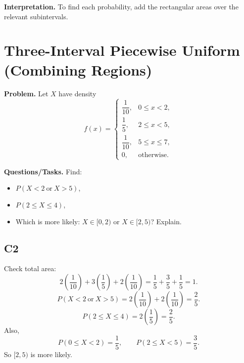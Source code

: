 \begin{center}
\begin{minipage}{0.48\textwidth}
	\end{minipage}
\end{center}

\textbf{Interpretation.}
To find each probability, add the rectangular areas over the relevant subintervals.

\section{Three-Interval Piecewise Uniform (Combining Regions)}

\textbf{Problem.}
Let $X$ have density
\[
f(x)=
\begin{cases}
\dfrac{1}{10}, & 0\le x<2,\\
\dfrac{1}{5}, & 2\le x<5,\\
\dfrac{1}{10}, & 5\le x\le 7,\\
0, & \text{otherwise.}
\end{cases}
\]

\textbf{Questions/Tasks.}
Find:
\begin{itemize}
    \item[(a)] $P(X<2\ \text{or}\ X>5)$,
    \item[(b)] $P(2\le X\le 4)$,
    \item[(c)] Which is more likely: $X\in[0,2)$ or $X\in[2,5)$? Explain.
\end{itemize}

\subsection*{C2}
Check total area:
\[
2\left(\frac{1}{10}\right)+3\left(\frac{1}{5}\right)+2\left(\frac{1}{10}\right)=\frac{1}{5}+\frac{3}{5}+\frac{1}{5}=1.
\]
\[
P(X<2\ \text{or}\ X>5)=2\left(\frac{1}{10}\right)+2\left(\frac{1}{10}\right)=\frac{2}{5}.
\]
\[
P(2\le X\le 4)=2\left(\frac{1}{5}\right)=\frac{2}{5}.
\]
Also,
\[
P(0\le X<2)=\frac{1}{5},\qquad P(2\le X<5)=\frac{3}{5}.
\]
So $[2,5)$ is more likely.

